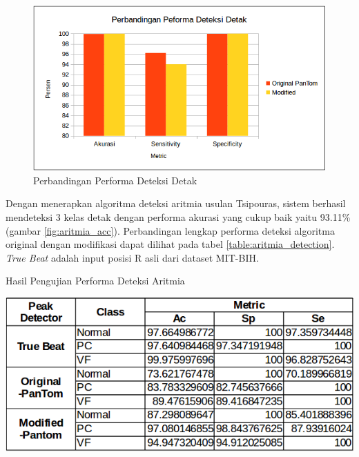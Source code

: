 \documentclass[]{indojc}
\begin{document}
\begin{figure}[H]
\centerline{\includegraphics[scale=0.41]{images/beat_perform.png}}
\caption{Perbandingan Performa Deteksi Detak}
\label{fig:beat_perform}
\end{figure}

Dengan menerapkan algoritma deteksi aritmia usulan Tsipouras, sistem berhasil mendeteksi 3 kelas detak dengan performa akurasi yang cukup baik yaitu 93.11\% (gambar \ref{fig:aritmia_acc}). Perbandingan lengkap performa deteksi algoritma original dengan modifikasi dapat dilihat pada tabel \ref{table:aritmia_detection}. \textit{True Beat} adalah input posisi R asli dari dataset MIT-BIH.

\begin{table}[H]
	\begin{center}
	\caption{Hasil Pengujian Performa Deteksi Aritmia}
	\includegraphics[scale=0.55]{images/aritmia_detection.png}	
	\label{table:aritmia_detection}
	\end{center}
\end{table}
\end{document}
